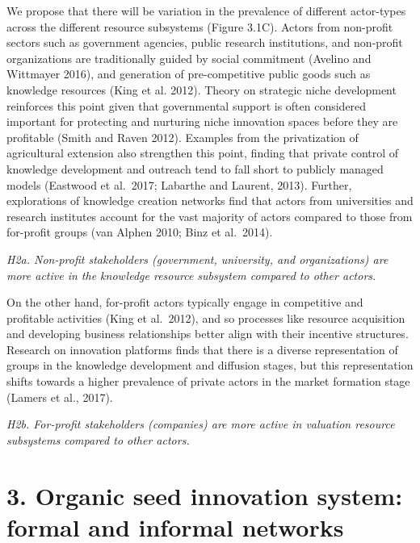 \documentclass[twoside,12pt,final]{ucthesis-CA2012}
\begin{document}
\begin{ucmainmatter}
We propose that there will be variation in the prevalence of different
actor-types across the different resource subsystems (Figure 3.1C).
Actors from non-profit sectors such as government agencies, public
research institutions, and non-profit organizations are traditionally
guided by social commitment (Avelino and Wittmayer 2016), and generation
of pre-competitive public goods such as knowledge resources (King et al.
2012). Theory on strategic niche development reinforces this point given
that governmental support is often considered important for protecting
and nurturing niche innovation spaces before they are profitable (Smith
and Raven 2012). Examples from the privatization of agricultural
extension also strengthen this point, finding that private control of
knowledge development and outreach tend to fall short to publicly
managed models (Eastwood et al.~2017; Labarthe and Laurent, 2013).
Further, explorations of knowledge creation networks find that actors
from universities and research institutes account for the vast majority
of actors compared to those from for-profit groups (van Alphen 2010;
Binz et al.~2014).

\emph{H2a. Non-profit stakeholders (government, university, and
organizations) are more active in the knowledge resource subsystem
compared to other actors.}

On the other hand, for-profit actors typically engage in competitive and
profitable activities (King et al.~2012), and so processes like resource
acquisition and developing business relationships better align with
their incentive structures. Research on innovation platforms finds that
there is a diverse representation of groups in the knowledge development
and diffusion stages, but this representation shifts towards a higher
prevalence of private actors in the market formation stage (Lamers et
al., 2017).

\emph{H2b. For-profit stakeholders (companies) are more active in valuation
resource subsystems compared to other actors.}

\hypertarget{organic-seed-innovation-system-formal-and-informal-networks}{%
\section{3. Organic seed innovation system: formal and informal networks}\label{organic-seed-innovation-system-formal-and-informal-networks}}


\end{ucmainmatter}
\end{document}
